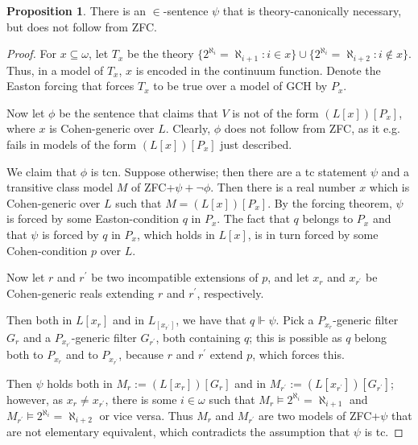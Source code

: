 \documentclass[a4paper,12pt]{amsart}
\theoremstyle{definition}
\newtheorem{prop}[fact]{Proposition}
\begin{document}
\begin{prop}{\label{tc informative}}
 There is an $\in$-sentence $\psi$ that is theory-canonically necessary, but does not follow from ZFC.
\end{prop}
\begin{proof}
For $x\subseteq\omega$, let $T_{x}$ be the theory $\{2^{\aleph_{i}}=\aleph_{i+1}:i\in x\}\cup\{2^{\aleph_{i}}=\aleph_{i+2}:i\notin x\}$. Thus, in a model of $T_{x}$, $x$ is encoded in the continuum function.
Denote the Easton forcing that forces $T_{x}$ to be true over a model of GCH by $P_{x}$.


Now let $\phi$ be the sentence that claims that $V$ is not of the form $(L[x])[P_{x}]$, where $x$ is Cohen-generic over $L$. Clearly, $\phi$ does not follow from ZFC, as it e.g. fails in models of the form $(L[x])[P_{x}]$ just 
described.

We claim that $\phi$ is tcn. Suppose otherwise; then there are a tc statement $\psi$ and a transitive class model $M$ of ZFC+$\psi+\neg\phi$. Then there is a real number $x$
which is Cohen-generic over $L$ such that $M=(L[x])[P_{x}]$. By the forcing theorem, $\psi$ is forced by some Easton-condition $q$ in $P_{x}$.
The fact that $q$ belongs to $P_{x}$ and that $\psi$ is forced by $q$ in $P_{x}$, which holds in $L[x]$, is in turn forced by some Cohen-condition $p$ over $L$.

Now let $r$ and $r^{\prime}$ be two incompatible extensions of $p$, and let $x_{r}$ and $x_{r^{\prime}}$ be Cohen-generic reals extending $r$ and $r^{\prime}$, respectively.

Then both in $L[x_{r}]$ and in $L_[x_{r^{\prime}}]$, we have that $q\Vdash\psi$. Pick a $P_{x_{r}}$-generic filter $G_{r}$ and a $P_{x_{r^{\prime}}}$-generic filter $G_{r^{\prime}}$, both containing $q$; 
this is possible as $q$ belong both to $P_{x_{r}}$ and to $P_{x_{r^{\prime}}}$, because $r$ and $r^{\prime}$ extend $p$, which forces this.

Then $\psi$ holds both in $M_{r}:=(L[x_{r}])[G_{r}]$ and in $M_{r^{\prime}}:=(L[x_{r^{\prime}}])[G_{r^{\prime}}]$; however, as $x_{r}\neq x_{r^{\prime}}$, there is some $i\in\omega$ such that 
$M_{r}\models 2^{\aleph_{i}}=\aleph_{i+1}$ and $M_{r^{\prime}}\models 2^{\aleph_{i}}=\aleph_{i+2}$ or vice versa. Thus $M_{r}$ and $M_{r^{\prime}}$ are two models of 
ZFC+$\psi$ that are not elementary equivalent, which contradicts the assumption that $\psi$ is tc.
\end{proof}
\end{document}
